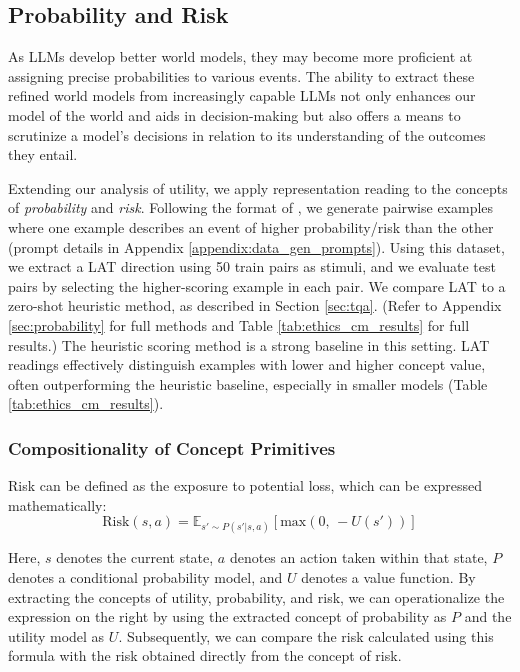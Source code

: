 \subsection{Probability and Risk}\label{subsec:probability_and_risk}

As LLMs develop better world models, they may become more proficient at assigning precise probabilities to various events. The ability to extract these refined world models from increasingly capable LLMs not only enhances our model of the world and aids in decision-making but also offers a means to scrutinize a model's decisions in relation to its understanding of the outcomes they entail.


Extending our analysis of utility, we apply representation reading to the concepts of \textit{probability} and \textit{risk}. Following the format of \citet{hendrycks2021aligning}, we generate pairwise examples where one example describes an event of higher probability/risk than the other (prompt details in Appendix \ref{appendix:data_gen_prompts}). Using this dataset, we extract a LAT direction using 50 train pairs as stimuli, and we evaluate test pairs by selecting the higher-scoring example in each pair. 
We compare LAT to a zero-shot heuristic method, as described in Section \ref{sec:tqa}. 
(Refer to Appendix \ref{sec:probability} for full methods and Table \ref{tab:ethics_cm_results} for full results.) The heuristic scoring method is a strong baseline in this setting. LAT readings effectively distinguish examples with lower and higher concept value, often outperforming the heuristic baseline, especially in smaller models (Table \ref{tab:ethics_cm_results}).



\subsubsection{Compositionality of Concept Primitives}
Risk can be defined as the exposure to potential loss, which can be expressed mathematically:
$$\text{Risk}(s, a) = \mathbb{E}_{s' \sim P(s'|s,a)} \left[ \text{max}(0, \, -U(s')) \right]$$

Here, $s$ denotes the current state, $a$ denotes an action taken within that state, $P$ denotes a conditional probability model, and $U$ denotes a value function. By extracting the concepts of utility, probability, and risk, we can operationalize the expression on the right by using the extracted concept of probability as $P$ and the utility model as $U$. Subsequently, we can compare the risk calculated using this formula with the risk obtained directly from the concept of risk.


